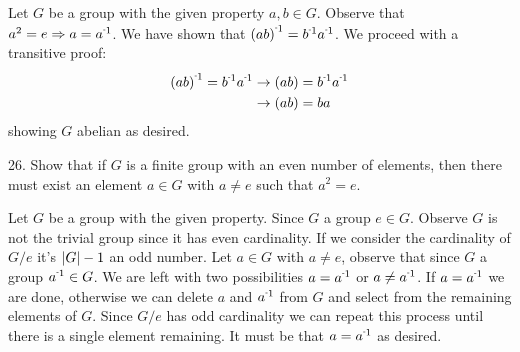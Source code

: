 \begin{mdframed}[style=darkAnswer,frametitle={Joe Starr}]
  Let $G$ be a group with the given property $a,b\in G$. Observe that 
  $a^2=e \Rightarrow a=\inv{a}$. We have shown that 
  $\inv{\lrp{ab}}=\inv{b}\inv{a}$.
  We proceed with a transitive proof: 
  \begin{align*}
    \inv{\lrp{ab}}=\inv{b}\inv{a} & \rightarrow \lrp{ab}=\inv{b}\inv{a} \\
                                  & \rightarrow \lrp{ab}={b}{a}         
  \end{align*}
  showing $G$ abelian as desired.
\end{mdframed}
\newpage
\begin{mdframed}[style=darkQuesion]
  26. Show that if $G$ is a finite group with an even number of elements, then 
  there must exist an element $a\in G$ with $a\neq e$ such that $a^2=e$. 
\end{mdframed}

\begin{mdframed}[style=darkAnswer,frametitle={Joe Starr}]
  Let $G$ be a group with the given property. Since $G$ a group $e\in G$. 
  Observe $G$ is not the trivial group since it has even cardinality. 
  If we consider the cardinality of $G/e$ it's $\left\vert G\right\vert-1$ an odd number. 
  Let $a\in G$ with $a\neq e$, observe that since $G$ a group $\inv{a}\in G$. 
  We are left with two possibilities $a=\inv{a}$ or $a\neq \inv{a}$. 
  If $a=\inv{a}$ we are done, otherwise we can delete $a$ and $\inv{a}$ from $G$ 
  and select from the remaining elements of $G$. Since $G/e$ has odd cardinality 
  we can repeat this process until there is a single element remaining. It must 
  be that $a=\inv{a}$ as desired. 
\end{mdframed}
\newpage
